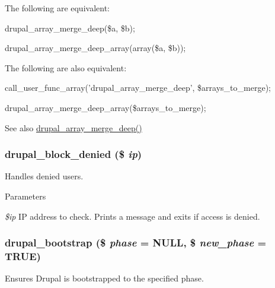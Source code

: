 The following are equivalent:
\begin{DoxyItemize}
\item drupal\_\-array\_\-merge\_\-deep(\$a, \$b);
\item drupal\_\-array\_\-merge\_\-deep\_\-array(array(\$a, \$b));
\end{DoxyItemize}

The following are also equivalent:
\begin{DoxyItemize}
\item call\_\-user\_\-func\_\-array('drupal\_\-array\_\-merge\_\-deep', \$arrays\_\-to\_\-merge);
\item drupal\_\-array\_\-merge\_\-deep\_\-array(\$arrays\_\-to\_\-merge);
\end{DoxyItemize}

\begin{DoxySeeAlso}{See also}
\hyperlink{bootstrap_8inc_a4e822805ef55b0a271ab181c9620837a}{drupal\_\-array\_\-merge\_\-deep()} 
\end{DoxySeeAlso}
\hypertarget{bootstrap_8inc_a82de27d521020862a868f567d6bd7dea}{
\subsubsection[{drupal\_\-block\_\-denied}]{\setlength{\rightskip}{0pt plus 5cm}drupal\_\-block\_\-denied (\$ {\em ip})}}
\label{bootstrap_8inc_a82de27d521020862a868f567d6bd7dea}
Handles denied users.


\begin{DoxyParams}{Parameters}
\item[{\em \$ip}]IP address to check. Prints a message and exits if access is denied. \end{DoxyParams}
\hypertarget{bootstrap_8inc_a8dcad7737ed560086bcdd9998a020a93}{
\subsubsection[{drupal\_\-bootstrap}]{\setlength{\rightskip}{0pt plus 5cm}drupal\_\-bootstrap (\$ {\em phase} = {\ttfamily NULL}, \/  \$ {\em new\_\-phase} = {\ttfamily TRUE})}}
\label{bootstrap_8inc_a8dcad7737ed560086bcdd9998a020a93}
Ensures Drupal is bootstrapped to the specified phase.

